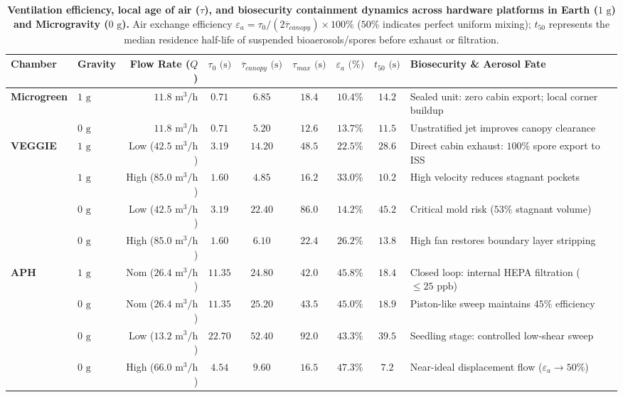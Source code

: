 \begin{table}[t]
\centering
\small
\caption{\textbf{Ventilation efficiency, local age of air ($\tau$), and biosecurity containment dynamics across hardware platforms in Earth ($1\text{ g}$) and Microgravity ($0\text{ g}$).} Air exchange efficiency $\varepsilon_a = \tau_0 / (2 \overline{\tau}_{canopy}) \times 100\%$ ($50\%$ indicates perfect uniform mixing); $t_{50}$ represents the median residence half-life of suspended bioaerosols/spores before exhaust or filtration.}
\label{tab:ventilation_metrics}
\begin{tabularx}{\textwidth}{llrcccccX}
\toprule
\textbf{Chamber} & \textbf{Gravity} & \textbf{Flow Rate ($Q$)} & $\tau_0\text{ (s)}$ & $\overline{\tau}_{canopy}\text{ (s)}$ & $\tau_{max}\text{ (s)}$ & $\varepsilon_a\text{ (\%)}$ & $t_{50}\text{ (s)}$ & \textbf{Biosecurity \& Aerosol Fate} \\
\midrule
\textbf{Microgreen} & $1\text{ g}$ & $11.8\text{ m}^3/\text{h}$ & $0.71$ & $6.85$ & $18.4$ & $10.4\%$ & $14.2$ & Sealed unit: zero cabin export; local corner buildup \\
& $0\text{ g}$ & $11.8\text{ m}^3/\text{h}$ & $0.71$ & $5.20$ & $12.6$ & $13.7\%$ & $11.5$ & Unstratified jet improves canopy clearance \\
\midrule
\textbf{VEGGIE} & $1\text{ g}$ & Low ($42.5\text{ m}^3/\text{h}$) & $3.19$ & $14.20$ & $48.5$ & $22.5\%$ & $28.6$ & Direct cabin exhaust: $100\%$ spore export to ISS \\
& $1\text{ g}$ & High ($85.0\text{ m}^3/\text{h}$) & $1.60$ & $4.85$ & $16.2$ & $33.0\%$ & $10.2$ & High velocity reduces stagnant pockets \\
& $0\text{ g}$ & Low ($42.5\text{ m}^3/\text{h}$) & $3.19$ & $22.40$ & $86.0$ & $14.2\%$ & $45.2$ & Critical mold risk ($53\%$ stagnant volume) \\
& $0\text{ g}$ & High ($85.0\text{ m}^3/\text{h}$) & $1.60$ & $6.10$ & $22.4$ & $26.2\%$ & $13.8$ & High fan restores boundary layer stripping \\
\midrule
\textbf{APH} & $1\text{ g}$ & Nom ($26.4\text{ m}^3/\text{h}$) & $11.35$ & $24.80$ & $42.0$ & $45.8\%$ & $18.4$ & Closed loop: internal HEPA filtration ($\le25\text{ ppb}$) \\
& $0\text{ g}$ & Nom ($26.4\text{ m}^3/\text{h}$) & $11.35$ & $25.20$ & $43.5$ & $45.0\%$ & $18.9$ & Piston-like sweep maintains $45\%$ efficiency \\
& $0\text{ g}$ & Low ($13.2\text{ m}^3/\text{h}$) & $22.70$ & $52.40$ & $92.0$ & $43.3\%$ & $39.5$ & Seedling stage: controlled low-shear sweep \\
& $0\text{ g}$ & High ($66.0\text{ m}^3/\text{h}$) & $4.54$ & $9.60$ & $16.5$ & $47.3\%$ & $7.2$ & Near-ideal displacement flow ($\varepsilon_a \to 50\%$) \\
\bottomrule
\end{tabularx}
\end{table}
